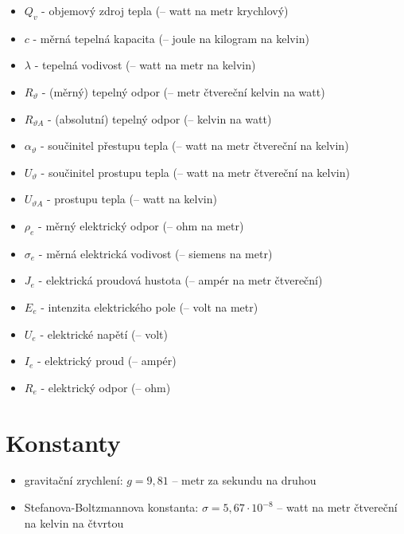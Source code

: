 \documentclass{article}
\begin{document}
\begin{itemize}
    \item $Q_v$ - objemový zdroj tepla (\ueqWandMinvcu \fs -- watt na metr krychlový)
    \item $c$ - měrná tepelná kapacita (\ueqJandKGinvKinv \fs -- joule na kilogram na kelvin)
    \item $\lambda$ - tepelná vodivost (\ueqWandMinvKinv \fs -- watt na metr na kelvin)
    \item $R_{\vartheta}$ - (měrný) tepelný odpor (\ueqMsqKandWinv \fs -- metr čtvereční kelvin na watt)
    \item $R_{\vartheta A}$ - (absolutní) tepelný odpor (\ueqKandWinv \fs -- kelvin na watt)
    \item $\alpha_{\vartheta}$ - součinitel přestupu tepla (\ueqWandMinvsqKinv \fs -- watt na metr čtvereční na kelvin)
    \item $U_{\vartheta}$ - součinitel prostupu tepla (\ueqWandMinvsqKinv \fs -- watt na metr čtvereční na kelvin)
    \item $U_{\vartheta A}$ - prostupu tepla (\ueqWandKinv \fs -- watt na kelvin)
    \item $\rho_e$ - měrný elektrický odpor (\ueqOHMandMinv \fs -- ohm na metr)
    \item $\sigma_e$ - měrná elektrická vodivost (\ueqSIEandMinv \fs -- siemens na metr)
    \item $J_e$ - elektrická proudová hustota (\ueqAandMinvsq \fs -- ampér na metr čtvereční)
    \item $E_e$ - intenzita elektrického pole (\ueqVandMinv \fs -- volt na metr)
    \item $U_e$ - elektrické napětí (\ueqV \fs -- volt)
    \item $I_e$ - elektrický proud (\ueqA \fs -- ampér)
    \item $R_e$ - elektrický odpor (\ueqOHM \fs -- ohm)
\end{itemize}

\newpage



\section{Konstanty}

\begin{itemize}
    \item gravitační zrychlení: $g = 9,81$ \ueqMandSinvsq \fs -- metr za sekundu na druhou
    \item Stefanova-Boltzmannova konstanta: $\sigma = 5,67 \cdot 10^{-8}$ \ueqWandMinvsqKinvquar \fs -- watt na metr čtvereční na kelvin na čtvrtou
\end{itemize}
\end{document}

